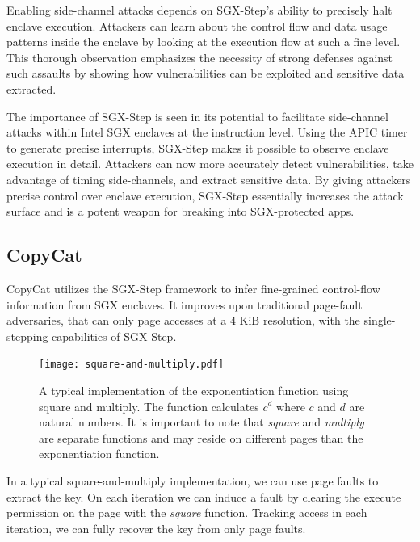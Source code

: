 \documentclass{llncs}
\begin{document}
Enabling side-channel attacks depends on SGX-Step's ability to precisely halt enclave execution. Attackers can learn about the control flow and data usage patterns inside the enclave by looking at the execution flow at such a fine level. This thorough observation emphasizes the necessity of strong defenses against such assaults by showing how vulnerabilities can be exploited and sensitive data extracted.

The importance of SGX-Step is seen in its potential to facilitate side-channel attacks within Intel SGX enclaves at the instruction level. Using the APIC timer to generate precise interrupts, SGX-Step makes it possible to observe enclave execution in detail. Attackers can now more accurately detect vulnerabilities, take advantage of timing side-channels, and extract sensitive data. By giving attackers precise control over enclave execution, SGX-Step essentially increases the attack surface and is a potent weapon for breaking into SGX-protected apps.
\subsection{CopyCat}

CopyCat \cite{MoghimiBHPS20} utilizes the SGX-Step framework
to infer fine-grained control-flow information from SGX enclaves.
It improves upon traditional page-fault adversaries,
that can only page accesses at a 4 KiB resolution,
with the single-stepping capabilities of SGX-Step.

\begin{figure}[t]
  \centering
  \texttt{[image: square-and-multiply.pdf]}
  \caption{A typical implementation of the exponentiation function using square and multiply.
    The function calculates $c^d$ where $c$ and $d$ are natural numbers.
    It is important to note that \emph{square} and \emph{multiply} are separate functions
    and may reside on different pages than the exponentiation function.}
  \label{fig:square-and-multiply}
\end{figure}

In a typical square-and-multiply implementation,
we can use page faults to extract the key.
On each iteration we can induce a fault by clearing the execute permission on
the page with the \emph{square} function.
Tracking access in each iteration, we can fully recover the key from only page faults.
\end{document}
